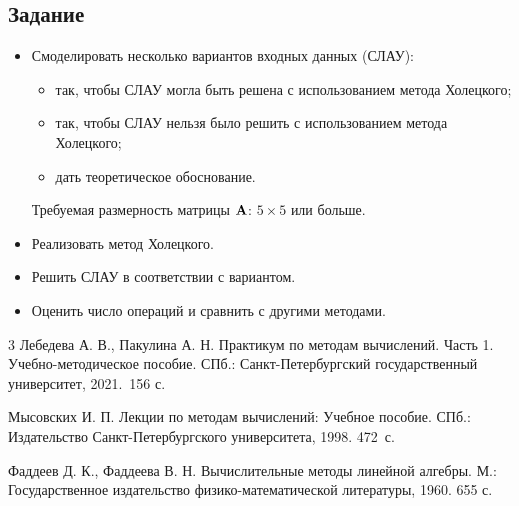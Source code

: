 \documentclass[12pt]{article}
\begin{document}
    \subsection*{Задание}

    \begin{itemize}
        \item Смоделировать несколько вариантов входных данных (СЛАУ):
        \begin{itemize}
        	\item так, чтобы СЛАУ могла быть решена с использованием метода Холецкого;
        	\item так, чтобы СЛАУ нельзя было решить с использованием метода Холецкого;
        	\item дать теоретическое обоснование.
        \end{itemize}
        Требуемая размерность матрицы $\bold{A}$: $5 \times 5$ или больше.
        \item Реализовать метод Холецкого.
        \item Решить СЛАУ в соответствии с вариантом.
        \item Оценить число операций и сравнить с другими методами.
    \end{itemize}

    \renewcommand{\bibname}{{Список литературы}}
    
    \begin{thebibliography}{3}
		Лебедева А. В., Пакулина А. Н. Практикум по методам вычислений. Часть 1. Учебно-методическое пособие. СПб.: Санкт-Петербургский государственный университет, 2021.~156 с.
		
		Мысовских И. П. Лекции по методам вычислений: Учебное пособие. СПб.: Издательство Санкт-Петербургского университета, 1998. 472~с.
		
		Фаддеев Д. К., Фаддеева В. Н. Вычислительные методы линейной алгебры. М.:  Государственное издательство физико-математической литературы, 1960. 655 с.
    \end{thebibliography}
\end{document}
